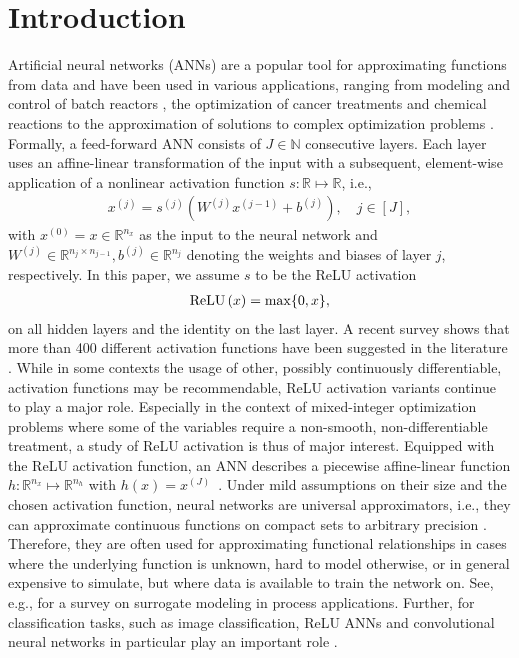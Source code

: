 \section{Introduction}\label{sec:introduction}

Artificial neural networks (ANNs) are a popular tool for approximating functions from data and have been used in various applications, ranging from modeling and control of batch reactors \citep{Mujtaba2006}, the optimization of cancer treatments \citep{Bertsimas2016} and chemical reactions \citep{Fernandes2006} to the approximation of solutions to complex optimization problems \citep{Bertsimas2022}. 
%
Formally, a feed-forward ANN consists of $J \in \mathbb N$ consecutive layers. Each layer uses an affine-linear transformation of the input with a subsequent, element-wise application of a nonlinear activation function $s: \mathbb R \mapsto \mathbb R$, i.e.,
\begin{align}\label{eq:ANN}
	x^{(j)} = s^{(j)}\left( W^{(j)} x^{(j-1)} + b^{(j)}  \right), \quad j \in [J],
\end{align}
with $x^{(0)} = x \in \mathbb{R}^{n_x}$ as the input to the neural network and $W^{(j)} \in \mathbb{R}^{n_j\times n_{j-1}}, b^{(j)} \in \mathbb{R}^{n_j}$ denoting the weights and biases of layer $j$, respectively.
%
In this paper, we assume $s$ to be the ReLU activation
\begin{align}\label{eq:relu}
    \textrm{ReLU}\left(x\right) = \max\{0,x\},
\end{align}
%
on all hidden layers and the identity on the last layer. 
A recent survey shows that more than 400 different activation functions have been suggested in the literature \citep{kunc2024three}. While in some contexts the usage of other, possibly continuously differentiable, activation functions may be recommendable, ReLU activation variants continue to play a major role. Especially in the context of mixed-integer optimization problems where some of the variables require a non-smooth, non-differentiable treatment, a study of ReLU activation is thus of major interest.
%
Equipped with the ReLU activation function, an ANN describes a piecewise affine-linear function $h \colon \mathbb{R}^{n_x} \mapsto \mathbb{R}^{n_h}$ with $h(x)=x^{(J)}$~\citep{Grigsby2022}. Under mild assumptions on their size and the chosen activation function, neural networks are universal approximators, i.e., they can approximate continuous functions on compact sets to arbitrary precision \citep{Cybenko1989,Hornik1991}. Therefore, they are often used for approximating functional relationships in cases where the underlying function is unknown, hard to model otherwise, or in general expensive to simulate, but where data is available to train the network on. See, e.g., \citet{Misener2023} for a survey on surrogate modeling in process applications. Further, for classification tasks, such as image classification, ReLU ANNs and convolutional neural networks in particular play an important role \citep{Krizhevsky2012}.
